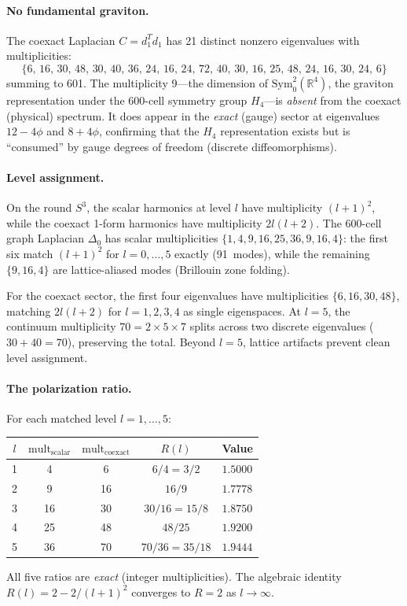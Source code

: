 \documentclass[12pt,a4paper]{article}
\theoremstyle{definition}
\begin{document}
\paragraph{No fundamental graviton.}
The coexact Laplacian $C = d_1^T d_1$ has 21 distinct nonzero eigenvalues with multiplicities:
\begin{equation}
\{6,\, 16,\, 30,\, 48,\, 30,\, 40,\, 36,\, 24,\, 16,\, 24,\, 72,\, 40,\, 30,\, 16,\, 25,\, 48,\, 24,\, 16,\, 30,\, 24,\, 6\}
\end{equation}
summing to 601.  The multiplicity 9---the dimension of $\mathrm{Sym}^2_0(\mathbb{R}^4)$, the graviton representation under the 600-cell symmetry group $H_4$---is \emph{absent} from the coexact (physical) spectrum.  It does appear in the \emph{exact} (gauge) sector at eigenvalues $12 - 4\phi$ and $8 + 4\phi$, confirming that the $H_4$ representation exists but is ``consumed'' by gauge degrees of freedom (discrete diffeomorphisms).

\paragraph{Level assignment.}
On the round $S^3$, the scalar harmonics at level $l$ have multiplicity $(l+1)^2$, while the coexact 1-form harmonics have multiplicity $2l(l+2)$.  The 600-cell graph Laplacian $\Delta_0$ has scalar multiplicities $\{1, 4, 9, 16, 25, 36, 9, 16, 4\}$: the first six match $(l+1)^2$ for $l = 0, \ldots, 5$ exactly (91~modes), while the remaining $\{9, 16, 4\}$ are lattice-aliased modes (Brillouin zone folding).

For the coexact sector, the first four eigenvalues have multiplicities $\{6, 16, 30, 48\}$, matching $2l(l+2)$ for $l = 1, 2, 3, 4$ as single eigenspaces.  At $l = 5$, the continuum multiplicity $70 = 2 \times 5 \times 7$ splits across two discrete eigenvalues ($30 + 40 = 70$), preserving the total.  Beyond $l = 5$, lattice artifacts prevent clean level assignment.

\paragraph{The polarization ratio.}
For each matched level $l = 1, \ldots, 5$:
\begin{center}
\begin{tabular}{ccccl}
\toprule
$l$ & $\mathrm{mult}_{\mathrm{scalar}}$ & $\mathrm{mult}_{\mathrm{coexact}}$ & $R(l)$ & Value \\
\midrule
1 & 4  & 6   & $6/4 = 3/2$     & $1.5000$ \\
2 & 9  & 16  & $16/9$           & $1.7778$ \\
3 & 16 & 30  & $30/16 = 15/8$   & $1.8750$ \\
4 & 25 & 48  & $48/25$          & $1.9200$ \\
5 & 36 & 70  & $70/36 = 35/18$  & $1.9444$ \\
\bottomrule
\end{tabular}
\end{center}
All five ratios are \emph{exact} (integer multiplicities).  The algebraic identity $R(l) = 2 - 2/(l+1)^2$ converges to $R = 2$ as $l \to \infty$.
\end{document}
